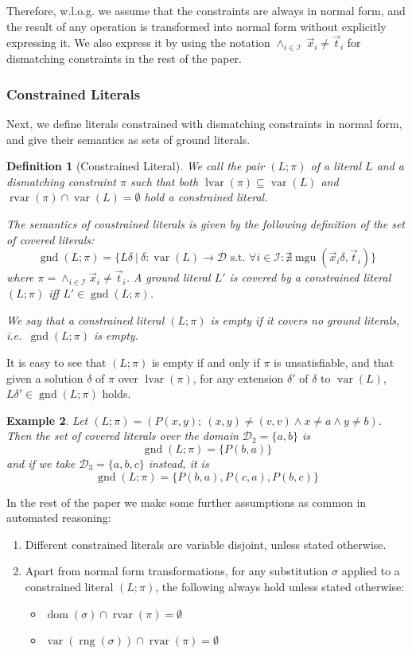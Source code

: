 \documentclass[a4paper]{article}
\newcommand{\mGnd}{\operatorname{gnd}} \newcommand{\mLVar}{\operatorname{lvar}} \newcommand{\mRVar}{\operatorname{rvar}} \newcommand{\mDmn}{\operatorname{dom}} \newcommand{\mRng}{\operatorname{rng}} \newcommand{\mMGU}{\operatorname{mgu}} \newcommand{\mDef}{\operatorname{def}} \newcommand{\mDomain}{\mathcal{D}} \newcommand{\mVar}{\operatorname{var}}
\newtheorem{defi}{Definition}[section]
\newtheorem{example}[defi]{Example}
\begin{document}
Therefore, w.l.o.g. we assume that the constraints are always in normal form, and 
the result of any operation is transformed into normal form without explicitly expressing it. 
We also express it by using the notation $\land_{i \in \mathcal{I}}~\vec{x}_i \ne \vec{t}_i$ 
for dismatching constraints in the rest of the paper.
\subsubsection*{Constrained Literals}
Next, we define literals constrained with dismatching constraints in normal form, and give their semantics as sets of 
ground literals.

\begin{defi}[Constrained Literal]
We call the pair $(L; \pi)$ of a literal $L$ and a dismatching constraint $\pi$ such that both
$\mLVar(\pi) \subseteq \mVar(L)$ and 
$\mRVar(\pi) \cap \mVar(L) = \emptyset$ hold
a \emph{constrained literal}.

The semantics of constrained literals is given by the following definition of the \emph{set of covered literals}:
\[\mGnd(L; \pi) = \{L\delta~|~\delta: \mVar(L)\rightarrow\mDomain\text{~s.t.~} 
					\forall i \in \mathcal{I}: \nexists\mMGU(\vec{x}_i\delta, \vec{t}_i)\}\]
where $\pi = \land_{i \in \mathcal{I}} \vec{x}_i \ne \vec{t}_i$.
A ground literal $L'$ is \emph{covered by} a constrained literal $(L; \pi)$ iff $L' \in \mGnd(L;\pi)$.

We say that a constrained literal $(L; \pi)$ is \emph{empty} if it covers no ground literals, i.e.\
$\mGnd(L; \pi)$ is empty.
\end{defi}

\indent
It is easy to see that $(L; \pi)$ is empty if and only if $\pi$ is unsatisfiable, and that given a solution $\delta$ of $\pi$ over 
$\mLVar(\pi)$, for any extension $\delta'$ of $\delta$ to $\mVar(L)$, 
$L\delta' \in \mGnd(L; \pi)$ holds.

\begin{example} Let $(L; \pi) = (P(x,y);~(x,y) \ne (v,v) \land x \ne a \land y \ne b)$.
Then the set of covered literals over the domain $\mDomain_2 = \{ a, b\}$ is
\[\mGnd(L; \pi) = \{ P(b,a) \}\]
and if we take $\mathcal{D}_3 = \{a,b,c\}$ instead, it is
\[\mGnd(L; \pi) = \{ P(b,a), P(c,a), P(b,c) \}\]
\end{example}
\noindent
In the rest of the paper we make some further assumptions as common in automated reasoning:
\begin{enumerate} 
	\item Different constrained literals are variable disjoint, unless stated otherwise.
	\item Apart from normal form transformations, for any substitution $\sigma$ applied to a constrained literal $(L; \pi)$,
	the following always hold unless stated otherwise:
	\begin{itemize}
		\item $\mDmn(\sigma) \cap \mRVar(\pi) = \emptyset$
		\item $\mVar(\mRng(\sigma)) \cap \mRVar(\pi) = \emptyset$
	\end{itemize}
\end{enumerate}
\end{document}
